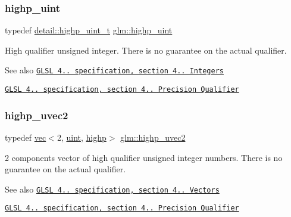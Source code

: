 \subsubsection{\texorpdfstring{highp\+\_\+uint}{highp\_uint}}
{\footnotesize\ttfamily typedef \hyperlink{namespaceglm_1_1detail_a994c05c8a976cc902a7cd193ad36bbba}{detail\+::highp\+\_\+uint\+\_\+t} \hyperlink{group__core__precision_gabfd1cf11193324a5f77d3831b6ac3205}{glm\+::highp\+\_\+uint}}

High qualifier unsigned integer. There is no guarantee on the actual qualifier.

\begin{DoxySeeAlso}{See also}
\href{http://www.opengl.org/registry/doc/GLSLangSpec.4.20.8.pdf}{\tt G\+L\+SL 4.. specification, section 4.. Integers} 

\href{http://www.opengl.org/registry/doc/GLSLangSpec.4.20.8.pdf}{\tt G\+L\+SL 4.. specification, section 4.. Precision Qualifier} 
\end{DoxySeeAlso}
\mbox{\label{group__core__precision_ga34aca1cdf2130b1179fd7c5554bc1883}} 
\subsubsection{\texorpdfstring{highp\+\_\+uvec2}{highp\_uvec2}}
{\footnotesize\ttfamily typedef \hyperlink{structglm_1_1vec}{vec}$<$2, \hyperlink{group__core__precision_ga4fd29415871152bfb5abd588334147c8}{uint}, \hyperlink{namespaceglm_a36ed105b07c7746804d7fdc7cc90ff25ac6f7eab42eacbb10d59a58e95e362074}{highp}$>$ \hyperlink{group__core__precision_ga34aca1cdf2130b1179fd7c5554bc1883}{glm\+::highp\+\_\+uvec2}}

2 components vector of high qualifier unsigned integer numbers. There is no guarantee on the actual qualifier.

\begin{DoxySeeAlso}{See also}
\href{http://www.opengl.org/registry/doc/GLSLangSpec.4.20.8.pdf}{\tt G\+L\+SL 4.. specification, section 4.. Vectors} 

\href{http://www.opengl.org/registry/doc/GLSLangSpec.4.20.8.pdf}{\tt G\+L\+SL 4.. specification, section 4.. Precision Qualifier} 
\end{DoxySeeAlso}
\mbox{\label{group__core__precision_ga2e16953ad75ce0c6d7faa921ca006ce5}} 
